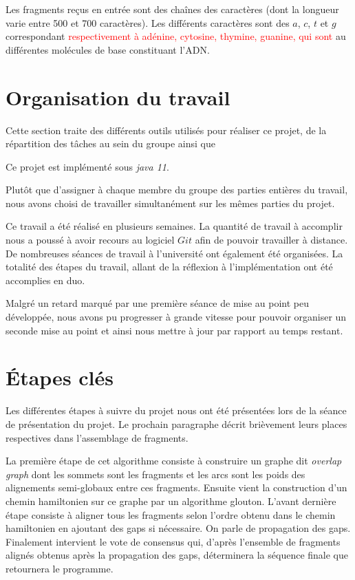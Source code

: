 \documentclass{article}
\begin{document}
Les fragments reçus en entrée sont des chaînes des caractères (dont la longueur varie entre 500 et 700 caractères). Les différents caractères sont des $a$, $c$, $t$ et $g$ correspondant \textcolor{red}{respectivement à adénine, cytosine, thymine, guanine, qui sont} au différentes molécules de base constituant l'ADN.


\section{Organisation du travail}

Cette section traite des différents outils utilisés pour réaliser ce projet, de la répartition des tâches au sein du groupe ainsi que 

Ce projet est implémenté sous \textit{java 11}. 

Plutôt que d'assigner à chaque membre du groupe des parties entières du travail, nous avons choisi de travailler simultanément sur les mêmes parties du projet. 

Ce travail a été réalisé en plusieurs semaines. La quantité de travail à accomplir nous a poussé à avoir recours au logiciel $Git$ afin de pouvoir travailler à distance. De nombreuses séances de travail à l'université ont également été organisées. La totalité des étapes du travail, allant de la réflexion à l'implémentation ont été accomplies en duo.

Malgré un retard marqué par une première séance de mise au point peu développée, nous avons pu progresser à grande vitesse pour pouvoir organiser un seconde mise au point et ainsi nous mettre à jour par rapport au temps restant.

\newpage

\section{\'Etapes clés}

Les différentes étapes à suivre du projet nous ont été présentées lors de la séance de présentation du projet. Le prochain paragraphe décrit brièvement leurs places respectives dans l'assemblage de fragments.

La première étape de cet algorithme consiste à construire un graphe dit \textit{overlap graph} dont les sommets sont les fragments   et les arcs sont les poids des alignements semi-globaux entre ces fragments.
Ensuite vient la construction d'un chemin hamiltonien sur ce graphe par un algorithme glouton.
L'avant dernière étape consiste à aligner tous les fragments selon l'ordre obtenu dans le chemin hamiltonien en ajoutant des gaps si nécessaire. On parle de propagation des gaps.
Finalement intervient le vote de consensus qui, d'après l'ensemble de fragments alignés obtenus après la propagation des gaps, déterminera la séquence finale que retournera le programme.
\end{document}

